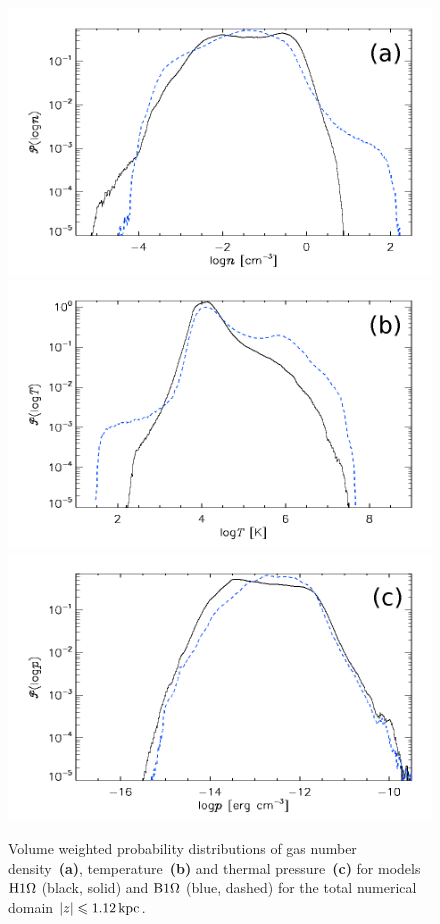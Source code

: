   \begin{figure}
  \centering
  \includegraphics[width=0.9\columnwidth,clip=true,trim=0 0 0 9mm]{fig/o1pr_rpdf.png}
  \includegraphics[width=0.9\columnwidth,clip=true,trim=0 0 0 9mm]{fig/o1pr_tpdf.png}
  \includegraphics[width=0.9\columnwidth,clip=true,trim=0 0 0 9mm]{fig/o1pr_ppdf.png}
    \caption[Total volume probability distributions for Model~$\Ompa$ and $\Omph$]{
  Volume weighted probability distributions of gas number
  density~{\textbf{(a)}}, temperature~{\textbf{(b)}} and thermal
  pressure~{\textbf{(c)}} for  models {$\Omph$} (black, solid) and
  {$\Ompa$} (blue, dashed) for the total numerical domain $|z|\leqslant1.12\,{\rm kpc}$.
    \label{fig:pdfm}}
  \end{figure}
